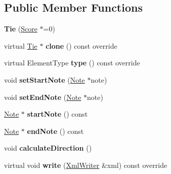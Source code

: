 \subsection*{Public Member Functions}
\begin{DoxyCompactItemize}
\item 
\mbox{\label{class_ms_1_1_tie_ae2eb5241e5a73dacb0f39c3704224e8b}} 
{\bfseries Tie} (\hyperlink{class_ms_1_1_score}{Score} $\ast$=0)
\item 
\mbox{\label{class_ms_1_1_tie_aa5ce316505b472b31c793f45467cf854}} 
virtual \hyperlink{class_ms_1_1_tie}{Tie} $\ast$ {\bfseries clone} () const override
\item 
\mbox{\label{class_ms_1_1_tie_a12980e52fd340ae1c4f9913423924ade}} 
virtual Element\+Type {\bfseries type} () const override
\item 
\mbox{\label{class_ms_1_1_tie_a1cb5bfc0bd49f11d8bb082d73033ac85}} 
void {\bfseries set\+Start\+Note} (\hyperlink{class_ms_1_1_note}{Note} $\ast$note)
\item 
\mbox{\label{class_ms_1_1_tie_a10612faf2ce6ddf3be9f99970df069b8}} 
void {\bfseries set\+End\+Note} (\hyperlink{class_ms_1_1_note}{Note} $\ast$note)
\item 
\mbox{\label{class_ms_1_1_tie_acdcb6924221b29a0e3d6ae3fa109aa14}} 
\hyperlink{class_ms_1_1_note}{Note} $\ast$ {\bfseries start\+Note} () const
\item 
\mbox{\label{class_ms_1_1_tie_a9719252bb8e38b88324bdd19ca07f13d}} 
\hyperlink{class_ms_1_1_note}{Note} $\ast$ {\bfseries end\+Note} () const
\item 
\mbox{\label{class_ms_1_1_tie_aeae1a802f5f92e98dad3e07a40baa932}} 
void {\bfseries calculate\+Direction} ()
\item 
\mbox{\label{class_ms_1_1_tie_a74bf0559e5a1ec5ca1d03f068715a28e}} 
virtual void {\bfseries write} (\hyperlink{class_ms_1_1_xml_writer}{Xml\+Writer} \&xml) const override
\item 
\mbox{\label{class_ms_1_1_tie_a30ad8bd3accdd547956953b83c9363af}} 

\end{DoxyCompactItemize}
